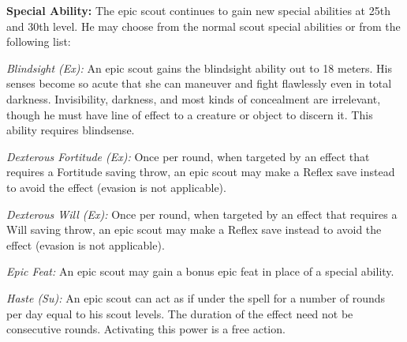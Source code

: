 \textbf{Special Ability:} The epic scout continues to gain new special abilities at 25th and 30th level. He may choose from the normal scout special abilities or from the following list:

\textit{Blindsight (Ex):} An epic scout gains the blindsight ability out to 18 meters. His senses become so acute that she can maneuver and fight flawlessly even in total darkness. Invisibility, darkness, and most kinds of concealment are irrelevant, though he must have line of effect to a creature or object to discern it. This ability requires blindsense.

\textit{Dexterous Fortitude (Ex):} Once per round, when targeted by an effect that requires a Fortitude saving throw, an epic scout may make a Reflex save instead to avoid the effect (evasion is not applicable).

\textit{Dexterous Will (Ex):} Once per round, when targeted by an effect that requires a Will saving throw, an epic scout may make a Reflex save instead to avoid the effect (evasion is not applicable).

\textit{Epic Feat:} An epic scout may gain a bonus epic feat in place of a special ability.

\textit{Haste (Su):} An epic scout can act as if under the  spell for a number of rounds per day equal to \onefifth his scout levels. The duration of the effect need not be consecutive rounds. Activating this power is a free action.
